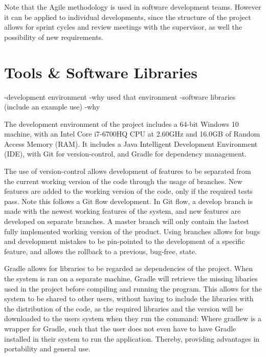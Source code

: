 \par Note that the Agile methodology is used in software development teams. However it can be applied to individual developments, since the structure of the project allows for sprint cycles and review meetings with the supervisor, as well the possibility of new requirements.

\section{Tools \& Software Libraries}
-development environment
-why used that environment
-software libraries (include an example use)
-why
\par The development environment of the project includes a 64-bit Windows 10 machine, with an Intel Core i7-6700HQ CPU at 2.60GHz and 16.0GB of Random Access Memory (RAM). It includes a Java Intelligent Development Environment (IDE), with Git for version-control, and Gradle for dependency management. 

\par The use of version-control allows development of features to be separated from the current working version of the code through the usage of branches. New features are added to the working version of the code, only if the required tests pass. Note this follows a Git flow development. In Git flow, a develop branch is made with the newest working features of the system, and new features are developed on separate branches. A master branch will only contain the lastest fully implemented working version of the product. Using branches allows for bugs and development mistakes to be pin-pointed to the development of a specific feature, and allows the rollback to a previous, bug-free, state.

\par Gradle allows for libraries to be regarded as dependencies of the project. When the system is ran on a separate machine, Gradle will retrieve the missing libaries used in the project before compiling and running the program. This allows for the system to be shared to other users, without having to include the libraries with the distribution of the code, as the required libraries and the version will be downloaded to the users system when they run the command:
Where gradlew is a wrapper for Gradle, such that the user does not even have to have Gradle installed in their system to run the application. Thereby, providing advantages in portability and general use.


